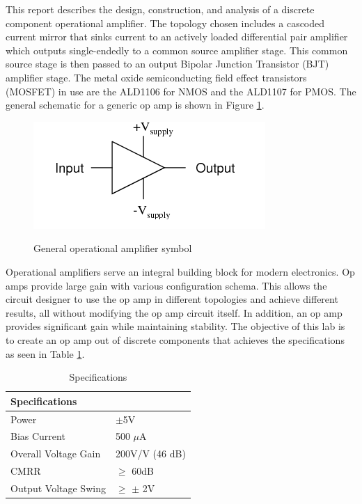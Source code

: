 



This report describes the design, construction, and analysis of a discrete component operational amplifier. The topology chosen includes a cascoded current mirror that sinks current to an actively loaded differential pair amplifier which outputs single-endedly to a common source amplifier stage. This common source stage is then passed to an output Bipolar Junction Transistor (BJT) amplifier stage. The metal oxide semiconducting field effect transistors (MOSFET) in use are the ALD1106 for NMOS and the ALD1107 for PMOS. The general schematic for a generic op amp is shown in Figure \ref{fig:gen_schem}.

\begin{figure}[H]
    \begin{center}
    \includegraphics[scale=.45]{Introduction/genericopamp.png}
    \caption{General operational amplifier symbol \cite{b1}}
    \cite{b1}
    \label{fig:gen_schem}
    \end{center}
    
\end{figure}
Operational amplifiers serve an integral building block for modern electronics. Op amps provide large gain with various configuration schema. This allows the circuit designer to use the op amp in different topologies and achieve different results, all without modifying the op amp circuit itself. In addition, an op amp provides significant gain while maintaining stability. The objective of this lab is to create an op amp out of discrete components that achieves the specifications as seen in Table \ref{tab:labspecs}.


\begin{table}[H]
\centering
\caption{Specifications}
\label{tab:labspecs}
\begin{tabular}{|l|l|}
\hline
\textbf{Specifications} &                 \\ \hline
Power                   & $\pm$5V         \\ \hline
Bias Current            & 500 $\mu$A      \\ \hline
Overall Voltage Gain    & 200V/V (46 dB)  \\ \hline
CMRR                    & $\geq$ 60dB     \\ \hline
Output Voltage Swing    & $\geq$ $\pm$ 2V \\ \hline
\end{tabular}
\end{table}

